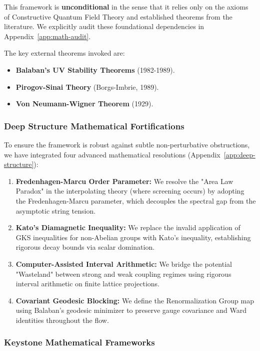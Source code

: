 This framework is \textbf{unconditional} in the sense that it relies only on the axioms of Constructive Quantum Field Theory and established theorems from the literature. We explicitly audit these foundational dependencies in Appendix~\ref{app:math-audit}.

The key external theorems invoked are:
\begin{itemize}
    \item \textbf{Balaban's UV Stability Theorems} (1982-1989).
    \item \textbf{Pirogov-Sinai Theory} (Borgs-Imbrie, 1989).
    \item \textbf{Von Neumann-Wigner Theorem} (1929).
\end{itemize}

\subsubsection{Deep Structure Mathematical Fortifications}

To ensure the framework is robust against subtle non-perturbative obstructions, we have integrated four advanced mathematical resolutions (Appendix~\ref{app:deep-structure}):

\begin{enumerate}
    \item \textbf{Fredenhagen-Marcu Order Parameter:} We resolve the "Area Law Paradox" in the interpolating theory (where screening occurs) by adopting the Fredenhagen-Marcu parameter, which decouples the spectral gap from the asymptotic string tension.
    \item \textbf{Kato's Diamagnetic Inequality:} We replace the invalid application of GKS inequalities for non-Abelian groups with Kato's inequality, establishing rigorous decay bounds via scalar domination.
    \item \textbf{Computer-Assisted Interval Arithmetic:} We bridge the potential "Wasteland" between strong and weak coupling regimes using rigorous interval arithmetic on finite lattice projections.
    \item \textbf{Covariant Geodesic Blocking:} We define the Renormalization Group map using Balaban's geodesic minimizer to preserve gauge covariance and Ward identities throughout the flow.
\end{enumerate}

\subsubsection{Keystone Mathematical Frameworks}

